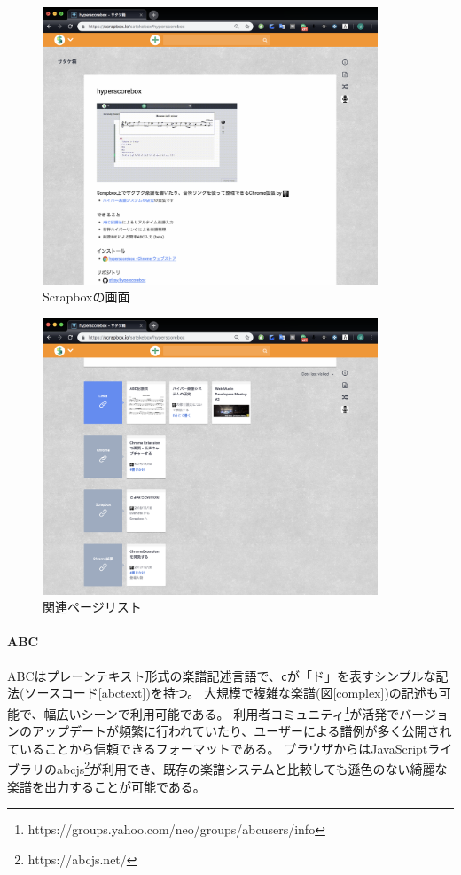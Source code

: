 \begin{figure}[H]
    \centering
    \includegraphics[width=10cm]{images/scrapbox.png}
    \caption{Scrapboxの画面}
    \label{scrap}
\end{figure}

\begin{figure}[H]
    \centering
    \includegraphics[width=10cm]{images/related.png}
    \caption{関連ページリスト}
    \label{related}
\end{figure}

\paragraph*{ABC}
ABCはプレーンテキスト形式の楽譜記述言語で、\texttt{c}が「ド」を表すシンプルな記法(ソースコード\ref{abctext})を持つ。
大規模で複雑な楽譜(図\ref{complex})の記述も可能で、幅広いシーンで利用可能である。
利用者コミュニティ\footnote{\textsf{https://groups.yahoo.com/neo/groups/abcusers/info}}が活発でバージョンのアップデートが頻繁に行われていたり、ユーザーによる譜例が多く公開されていることから信頼できるフォーマットである。
ブラウザからはJavaScriptライブラリのabcjs\footnote{\textsf{https://abcjs.net/}}が利用でき、既存の楽譜システムと比較しても遜色のない綺麗な楽譜を出力することが可能である。

